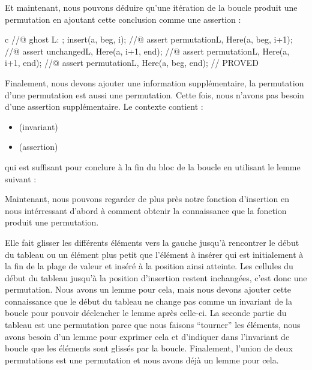 

Et maintenant, nous pouvons déduire qu'une itération de la boucle produit
une permutation en ajoutant cette conclusion comme une assertion :


\begin{CodeBlock}{c}
    //@ ghost L: ;
    insert(a, beg, i);
    //@ assert permutation{L, Here}(a, beg, i+1);
    //@ assert unchanged{L, Here}(a, i+1, end);
    //@ assert permutation{L, Here}(a, i+1, end);
    //@ assert permutation{L, Here}(a, beg, end); // PROVED
\end{CodeBlock}


Finalement, nous devons ajouter une information supplémentaire, la permutation
d'une permutation est aussi une permutation. Cette fois, nous n'avons pas
besoin d'une assertion supplémentaire. Le contexte contient :
\begin{itemize}
\item {} (invariant)
\item {} (assertion)
\end{itemize}
qui est suffisant pour conclure 
à la fin du bloc de la boucle en utilisant le lemme suivant :




Maintenant, nous pouvons regarder de plus près notre fonction d'insertion en
nous intérressant d'abord à comment obtenir la connaissance que la fonction
produit une permutation.


Elle fait glisser les différents éléments vers la gauche jusqu'à rencontrer le
début du tableau ou un élément plus petit que l'élément à insérer qui est
initialement à la fin de la plage de valeur et inséré à la position ainsi atteinte.
Les cellules du début du tableau jusqu'à la position d'insertion restent
inchangées, c'est donc une permutation. Nous avons un lemme pour cela, mais nous
devons ajouter cette connaissance que le début du tableau ne change pas comme
un invariant de la boucle pour pouvoir déclencher le lemme après celle-ci. La
seconde partie du tableau est une permutation parce que nous faisons ``tourner''
les éléments, nous avons besoin d'un lemme pour exprimer cela et d'indiquer dans
l'invariant de boucle que les éléments sont glissés par la boucle. Finalement,
l'union de deux permutations est une permutation et nous avons déjà un lemme
pour cela.


